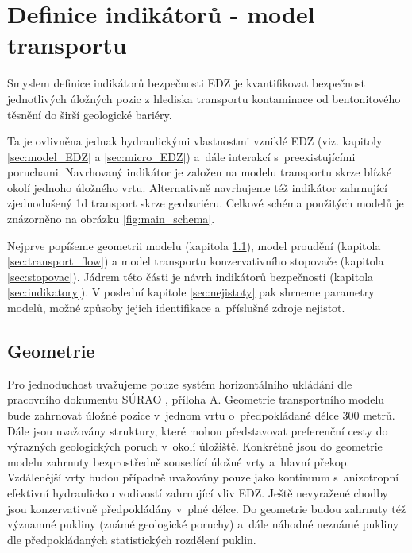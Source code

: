 \documentclass{article}
\begin{document}
\section{Definice indikátorů - model transportu}
\label{sec:transport}



Smyslem definice indikátorů bezpečnosti EDZ je kvantifikovat bezpečnost jednotlivých úložných pozic z hlediska 
transportu kontaminace od bentonitového těsnění do širší geologické bariéry. 

Ta je ovlivněna jednak hydraulickými vlastnostmi
vzniklé EDZ (viz. kapitoly \ref{sec:model_EDZ} a \ref{sec:micro_EDZ}) a~dále interakcí s~preexistujícími poruchami. 
Navrhovaný indikátor je založen na modelu transportu skrze blízké okolí jednoho úložného vrtu. Alternativně navrhujeme též indikátor zahrnující zjednodušený 1d transport skrze geobariéru.
Celkové schéma použitých modelů je znázorněno na obrázku \ref{fig:main_schema}.


Nejprve popíšeme geometrii modelu (kapitola  \ref{sec:transport_geometrie}), model proudění (kapitola \ref{sec:transport_flow})
a model transportu konzervativního stopovače (kapitola \ref{sec:stopovac}). Jádrem této části je návrh indikátorů bezpečnosti (kapitola \ref{sec:indikatory}). 
V poslední kapitole \ref{sec:nejistoty} pak shrneme parametry modelů, možné způsoby jejich identifikace a~příslušné zdroje nejistot.



\subsection{Geometrie}
\label{sec:transport_geometrie}
 Pro jednoduchost uvažujeme pouze systém horizontálního ukládání dle pracovního dokumentu SÚRAO , příloha A. 
 Geometrie transportního modelu bude zahrnovat úložné pozice v~jednom vrtu o~předpokládané délce 300 metrů. 
 Dále jsou uvažovány  struktury, které mohou představovat preferenční cesty do výrazných geologických poruch v~okolí úložiště. 
 Konkrétně jsou do geometrie modelu zahrnuty bezprostředně sousedící úložné vrty a~hlavní překop. Vzdálenější vrty budou případně 
 uvažovány pouze jako kontinuum s~anizotropní efektivní hydraulickou vodivostí zahrnující vliv EDZ. 
Ještě nevyražené chodby jsou konzervativně předpokládány v~plné délce. Do geometrie budou zahrnuty též významné pukliny 
(známé geologické poruchy) a~dále náhodné neznámé pukliny dle předpokládaných statistických rozdělení puklin.
\end{document}
